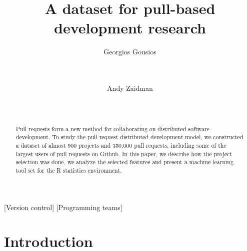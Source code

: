 \documentclass{sig-alternate}
\begin{document}
\newcommand{\todo}[1]{\textbf{TODO}\footnote{\textbf{TODO:} #1}}

\newcommand{\ghtorrent}{ \textsc{ght}orrent\xspace}
\newcommand{\api}{\textsc{api}\xspace}
\newcommand{\pullreqs}{ \textsf{pullreqs}\xspace}

\title{A dataset for pull-based development research}

\author{
\alignauthor
Georgios Gousios\\
       \\
       \\
\and
Andy Zaidman\\
       \\
       \\
}

\maketitle

\begin{abstract}

Pull requests form a new method for collaborating on distributed software
development. To study the pull request distributed development model, we
constructed a dataset of almost 900 projects and 350,000 pull requests, 
including some of the largest
users of pull requests on Github. In this paper, we describe how the project
selection was done, we analyze the selected features and present a machine
learning tool set for the R statistics environment. 

\end{abstract}

[Version control]
[Programming teams]



\section{Introduction}
\label{sec:intro}
\end{document}
